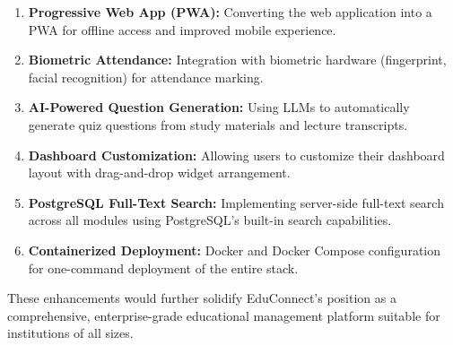 \begin{enumerate}[label=\arabic*., leftmargin=2em]
    \item \textbf{Progressive Web App (PWA):} Converting the web application into a PWA for offline access and improved mobile experience.
    
    \item \textbf{Biometric Attendance:} Integration with biometric hardware (fingerprint, facial recognition) for attendance marking.
    
    \item \textbf{AI-Powered Question Generation:} Using LLMs to automatically generate quiz questions from study materials and lecture transcripts.
    
    \item \textbf{Dashboard Customization:} Allowing users to customize their dashboard layout with drag-and-drop widget arrangement.
    
    \item \textbf{PostgreSQL Full-Text Search:} Implementing server-side full-text search across all modules using PostgreSQL's built-in search capabilities.
    
    \item \textbf{Containerized Deployment:} Docker and Docker Compose configuration for one-command deployment of the entire stack.
\end{enumerate}

These enhancements would further solidify EduConnect's position as a comprehensive, enterprise-grade educational management platform suitable for institutions of all sizes.